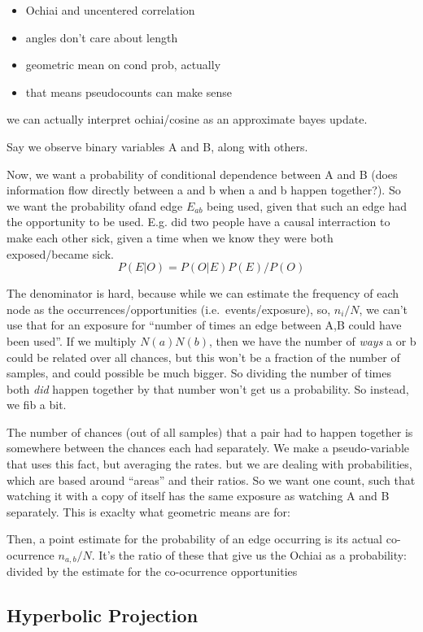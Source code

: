 \documentclass[%
	12pt,
		oneside,
		letterpaper
]{book}
\providecommand{\tightlist}{%
  \setlength{\itemsep}{0pt}\setlength{\parskip}{0pt}}\usepackage{longtable,booktabs,array}
\begin{document}
\begin{itemize}
\tightlist
\item
  Ochiai and uncentered correlation
\item
  angles don't care about length
\item
  geometric mean on cond prob, actually
\item
  that means pseudocounts can make sense
\end{itemize}

we can actually interpret ochiai/cosine as an approximate bayes update.

Say we observe binary variables A and B, along with others.

Now, we want a probability of conditional dependence between A and B
(does information flow directly between a and b when a and b happen
together?). So we want the probability ofand edge \(E_{ab}\) being used,
given that such an edge had the opportunity to be used. E.g. did two
people have a causal interraction to make each other sick, given a time
when we know they were both exposed/became sick.
\[P(E|O) = P(O|E)P(E)/P(O)\]

The denominator is hard, because while we can estimate the frequency of
each node as the occurrences/opportunities (i.e.~events/exposure), so,
\(n_i/N\), we can't use that for an exposure for ``number of times an
edge between A,B could have been used''. If we multiply \(N(a)N(b)\),
then we have the number of \emph{ways} a or b could be related over all
chances, but this won't be a fraction of the number of samples, and
could possible be much bigger. So dividing the number of times both
\emph{did} happen together by that number won't get us a probability. So
instead, we fib a bit.

The number of chances (out of all samples) that a pair had to happen
together is somewhere between the chances each had separately. We make a
pseudo-variable that uses this fact, but averaging the rates. but we are
dealing with probabilities, which are based around ``areas'' and their
ratios. So we want one count, such that watching it with a copy of
itself has the same exposure as watching A and B separately. This is
exaclty what geometric means are for:

Then, a point estimate for the probability of an edge occurring is its
actual co-ocurrence \(n_{a,b}/N\). It's the ratio of these that give us
the Ochiai as a probability: divided by the estimate for the
co-ocurrence opportunities

\subsection{Hyperbolic Projection}\label{hyperbolic-projection}
\end{document}
